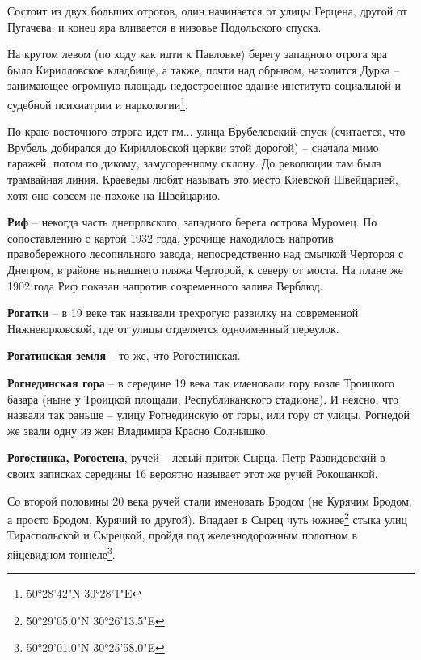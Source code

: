 Состоит из двух больших отрогов, один начинается от улицы Герцена, другой от Пугачева, и конец яра вливается в низовье Подольского спуска.

На крутом левом (по ходу как идти к Павловке) берегу западного отрога яра было Кирилловское кладбище, а также, почти над обрывом, находится Дурка – занимающее огромную площадь недостроенное здание института социальной и судебной психиатрии и наркологии\footnote{50°28'42"N 30°28'1"E}.

По краю восточного отрога идет гм... улица Врубелевский спуск (считается, что Врубель добирался до Кирилловской церкви этой дорогой) – сначала мимо гаражей, потом по дикому, замусоренному склону. До революции там была трамвайная линия. Краеведы любят называть это место Киевской Швейцарией, хотя оно совсем не похоже на Швейцарию.\\

\medskip


\textbf{Риф} – некогда часть днепровского, западного берега острова Муромец. По сопоставлению с картой 1932 года, урочище находилось напротив правобережного лесопильного завода, непосредственно над смычкой Чертороя с Днепром, в районе нынешнего пляжа Черторой, к северу от моста. На плане же 1902 года Риф показан напротив современного залива Верблюд.\\

\medskip

\textbf{Рогатки} – в 19 веке так называли трехрогую развилку на современной Нижнеюрковской, где от улицы отделяется одноименный переулок.\\

\medskip

\textbf{Рогатинская земля} – то же, что Рогостинская.\\

\medskip

\textbf{Рогнединская гора} – в середине 19 века так именовали гору возле Троицкого базара (ны\-не у Троицкой площади, Республиканского стадиона). И неясно, что назвали так раньше – улицу Рогнединскую от горы, или гору от улицы. Рогнедой же звали одну из жен Владимира Красно Солнышко.\\

\medskip

\textbf{Рогостинка, Рогостена}, ручей – левый приток Сырца. Петр Развидовский в своих записках середины 16 вероятно называет этот же ручей Рокошанкой.

Со второй половины 20 века ручей стали именовать Бродом (не Курячим Бродом, а просто Бродом, Курячий то другой). Впадает в Сырец чуть южнее\footnote{50°29'05.0"N 30°26'13.5"E} стыка улиц Тираспольской и Сырецкой, пройдя под железнодорожным полотном в яйцевидном тоннеле\footnote{50°29'01.0"N 30°25'58.0"E}.

